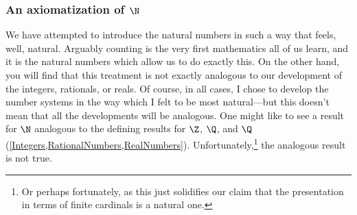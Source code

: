 \subsubsection{An axiomatization of \texorpdfstring{$\N$}{N}}

We have attempted to introduce the natural numbers in such a way that feels, well, natural.  Arguably counting is the very first mathematics all of us learn, and it is the natural numbers which allow us to do exactly this.  On the other hand, you will find that this treatment is not exactly analogous to our development of the integers, rationals, or reals.  Of course, in all cases, I chose to develop the number systems in the way which I felt to be most natural---but this doesn't mean that all the developments will be analogous.  One might like to see a result for $\N$ analogous to the defining results for $\Z$, $\Q$, and $\Q$ (\cref{Integers,RationalNumbers,RealNumbers}).  Unfortunately,\footnote{Or perhaps fortunately, as this just solidifies our claim that the presentation in terms of finite cardinals is a natural one.} the analogous result is not true.
